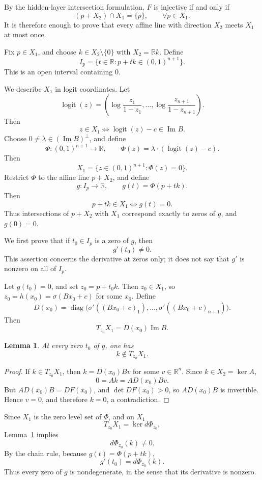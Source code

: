 \documentclass[a4paper,11pt]{article}
\theoremstyle{plain}
\newtheorem{lemma}[theorem]{Lemma}
\theoremstyle{definition}
\theoremstyle{remark}
\DeclareMathOperator{\Imop}{Im}
\DeclareMathOperator{\diag}{diag}
\DeclareMathOperator{\logit}{logit}
\begin{document}
By the hidden-layer intersection formulation, \(F\) is injective if and only if
\[
(p+X_2)\cap X_1=\{p\},
\qquad \forall p\in X_1.
\]
It is therefore enough to prove that every affine line with direction \(X_2\) meets \(X_1\) at most once.

Fix \(p\in X_1\), and choose \(k\in X_2\setminus\{0\}\) with \(X_2=\mathbb R k\). Define
\[
I_p=\{t\in\mathbb R:p+tk\in(0,1)^{n+1}\}.
\]
This is an open interval containing \(0\).

We describe \(X_1\) in logit coordinates. Let
\[
\logit(z)=\left(\log\frac{z_1}{1-z_1},\ldots,\log\frac{z_{n+1}}{1-z_{n+1}}\right).
\]
Then
\[
z\in X_1
\iff
\logit(z)-c\in\Imop B.
\]
Choose \(0\ne\lambda\in(\Imop B)^\perp\), and define
\[
\Phi:(0,1)^{n+1}\to\mathbb R,
\qquad
\Phi(z)=\lambda\cdot(\logit(z)-c).
\]
Then
\[
X_1=\{z\in(0,1)^{n+1}:\Phi(z)=0\}.
\]
Restrict \(\Phi\) to the affine line \(p+X_2\), and define
\[
g:I_p\to\mathbb R,
\qquad
g(t)=\Phi(p+tk).
\]
Then
\[
p+tk\in X_1\iff g(t)=0.
\]
Thus intersections of \(p+X_2\) with \(X_1\) correspond exactly to zeros of \(g\), and \(g(0)=0\).

We first prove that if \(t_0\in I_p\) is a zero of \(g\), then
\[
g'(t_0)\ne0.
\]
This assertion concerns the derivative at zeros only; it does not say that \(g'\) is nonzero on all of \(I_p\).

Let \(g(t_0)=0\), and set \(z_0=p+t_0k\). Then \(z_0\in X_1\), so \(z_0=h(x_0)=\sigma(Bx_0+c)\) for some \(x_0\). Define
\[
D(x_0)=\diag\bigl(\sigma'((Bx_0+c)_1),\ldots,\sigma'((Bx_0+c)_{n+1})\bigr).
\]
Then
\[
T_{z_0}X_1=D(x_0)\Imop B.
\]

\begin{lemma}\label{lem:not-tangent}
At every zero \(t_0\) of \(g\), one has
\[
k\notin T_{z_0}X_1.
\]
\end{lemma}

\begin{proof}
If \(k\in T_{z_0}X_1\), then \(k=D(x_0)Bv\) for some \(v\in\mathbb R^n\). Since \(k\in X_2=\ker A\),
\[
0=Ak=AD(x_0)Bv.
\]
But \(AD(x_0)B=DF(x_0)\), and \(\det DF(x_0)>0\), so \(AD(x_0)B\) is invertible. Hence \(v=0\), and therefore \(k=0\), a contradiction.
\end{proof}

Since \(X_1\) is the zero level set of \(\Phi\), and on \(X_1\)
\[
T_{z_0}X_1=\ker d\Phi_{z_0},
\]
Lemma~\ref{lem:not-tangent} implies
\[
d\Phi_{z_0}(k)\ne0.
\]
By the chain rule, because \(g(t)=\Phi(p+tk)\),
\[
g'(t_0)=d\Phi_{z_0}(k).
\]
Thus every zero of \(g\) is nondegenerate, in the sense that its derivative is nonzero.
\end{document}
